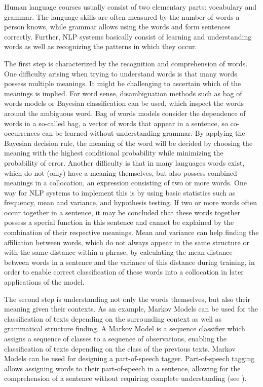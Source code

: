 \documentclass[]{krantz}
\begin{document}
Human language courses usually consist of two elementary parts: vocabulary and grammar. The language skills are often measured by the number of words a person knows, while grammar allows using the words and form sentences correctly. Further, NLP systems basically consist of learning and understanding words as well as recognizing the patterns in which they occur.

The first step is characterized by the recognition and comprehension of words. One difficulty arising when trying to understand words is that many words possess multiple meanings. It might be challenging to ascertain which of the meanings is implied. For word sense, disambiguation methods such as bag of words models or Bayesian classification can be used, which inspect the words around the ambiguous word.
Bag of words models consider the dependence of words in a so-called bag, a vector of words that appear in a sentence, so co-occurrences can be learned without understanding grammar.
By applying the Bayesian decision rule, the meaning of the word will be decided by choosing the meaning with the highest conditional probability while minimizing the probability of error.
Another difficulty is that in many languages words exist, which do not (only) have a meaning themselves, but also possess combined meanings in a collocation, an expression consisting of two or more words. One way for NLP systems to implement this is by using basic statistics such as frequency, mean and variance, and hypothesis testing. If two or more words often occur together in a sentence, it may be concluded that these words together possess a special function in this sentence and cannot be explained by the combination of their respective meanings. Mean and variance can help finding the affiliation between words, which do not always appear in the same structure or with the same distance within a phrase, by calculating the mean distance between words in a sentence and the variance of this distance during training, in order to enable correct classification of these words into a collocation in later applications of the model.

The second step is understanding not only the words themselves, but also their meaning given their contexts. As an example, Markov Models can be used for the classification of texts depending on the surrounding context as well as grammatical structure finding. A Markov Model is a sequence classifier which assigns a sequence of classes to a sequence of observations, enabling the classification of texts depending on the class of the previous texts. Markov Models can be used for designing a part-of-speech tagger. Part-of-speech tagging allows assigning words to their part-of-speech in a sentence, allowing for the comprehension of a sentence without requiring complete understanding (see \citet{manning2008}).
\end{document}
